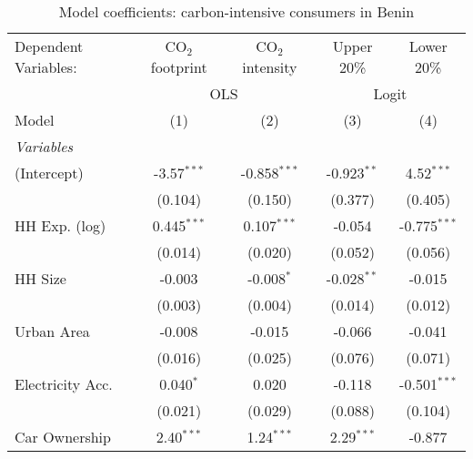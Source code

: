 
\begin{table}[htbp!]
   \centering
   \small
   \begin{adjustbox}{width = 1\textwidth, max height = 0.95\textheight, center}
      \begin{threeparttable}[b]
         \caption{\label{tab:Logit_1_BEN} Model coefficients: carbon-intensive consumers in Benin}
         \begin{tabular}{lcccc}
            \tabularnewline \midrule \midrule
            Dependent Variables: & CO$_{2}$ footprint & CO$_{2}$ intensity & Upper 20\%    & Lower 20\%\\   
             & \multicolumn{2}{c}{OLS} & \multicolumn{2}{c}{Logit} \\ 
            Model                & (1)                & (2)                & (3)           & (4)\\  
            \midrule
            \emph{Variables}\\
            (Intercept)          & -3.57$^{***}$      & -0.858$^{***}$     & -0.923$^{**}$ & 4.52$^{***}$\\   
                                 & (0.104)            & (0.150)            & (0.377)       & (0.405)\\   
            HH Exp. (log)        & 0.445$^{***}$      & 0.107$^{***}$      & -0.054        & -0.775$^{***}$\\   
                                 & (0.014)            & (0.020)            & (0.052)       & (0.056)\\   
            HH Size              & -0.003             & -0.008$^{*}$       & -0.028$^{**}$ & -0.015\\   
                                 & (0.003)            & (0.004)            & (0.014)       & (0.012)\\   
            Urban Area           & -0.008             & -0.015             & -0.066        & -0.041\\   
                                 & (0.016)            & (0.025)            & (0.076)       & (0.071)\\   
            Electricity Acc.     & 0.040$^{*}$        & 0.020              & -0.118        & -0.501$^{***}$\\   
                                 & (0.021)            & (0.029)            & (0.088)       & (0.104)\\   
            Car Ownership        & 2.40$^{***}$       & 1.24$^{***}$       & 2.29$^{***}$  & -0.877\\   

\end{tabular}
\end{threeparttable}
\end{adjustbox}
\end{table}
